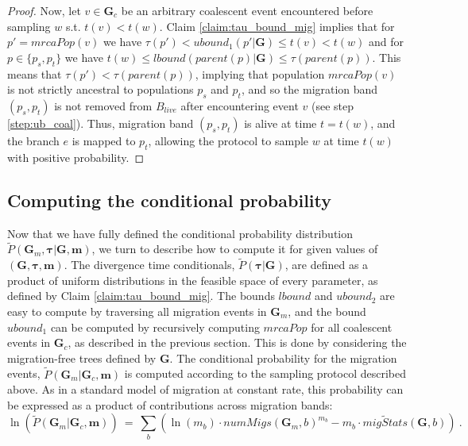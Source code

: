 \documentclass[11pt]{article}
\newcommand{\vect}[1]{\boldsymbol{\mathbf{#1}}}
\newcommand{\G}{\vect{G}}
\newcommand{\Pref}{\widetilde{P}}
\newcommand{\1}{\mathbbm{1}}
\newcommand{\Gc}{\G_c}
\newcommand{\Gm}{\G_m}
\newcommand{\taus}{\vect\tau}
\newcommand{\migs}{\vect{m}}
\begin{document}
\begin{proof}
 Now, let $v\in\Gc$ be an arbitrary coalescent event encountered before sampling $w$ s.t. $t(v)<t(w)$.
 Claim \ref{claim:tau_bound_mig} implies that for $p'=mrcaPop(v)$ we have $\tau(p')<ubound_1(p'|\G) \leq t(v)<t(w)$ and
 for $p\in\{p_s,p_t\}$ we have $t(w)\leq lbound(parent(p)|\G) \leq \tau(parent(p))$.
 This means that $\tau(p')<\tau(parent(p))$, implying that population $mrcaPop(v)$ is not strictly ancestral to populations $p_s$ and $p_t$,
 and so the migration band $(p_s,p_t)$ is not removed from $B_{live}$ after encountering event $v$ (see step \ref{step:ub_coal}).
 Thus, migration band $(p_s,p_t)$ is alive at time $t=t(w)$, and the branch $e$ is mapped to $p_t$,
 allowing the protocol to sample $w$ at time $t(w)$ with positive probability.
 \end{proof}

\subsection*{Computing the conditional probability}

Now that we have fully defined the conditional probability distribution $\Pref(\Gm,\taus|\G,\migs)$, we turn to describe how to compute it for given values of $(\G,\taus,\migs)$.
The divergence time conditionals, $\Pref(\taus|\G)$, are defined as a product of uniform distributions in the feasible space of every parameter, as defined by Claim \ref{claim:tau_bound_mig}.
The bounds $lbound$ and $ubound_2$ are easy to compute by traversing all migration events in $\Gm$, and the bound $ubound_1$ can be computed by recursively computing $mrcaPop$ for all coalescent
events in $\Gc$, as described in the previous section. This is done by considering the migration-free trees defined by $\G$.
%
The conditional probability for the migration events, $\Pref(\Gm|\Gc,\migs)$ is computed according to the sampling protocol described above.
%
As in a standard model of migration at constant rate, this probability can be expressed as a product of contributions across migration bands:
\begin{equation}\label{eq:pref-m}
 \ln \left( \Pref(\Gm|\Gc,\migs) \right) ~=~ \sum_b \left( \ln( m_b) \cdot numMigs(\Gm,b)^{m_b} -m_b \cdot \widetilde{migStats}(\G,b) \right) ~.
\end{equation}
\end{document}
